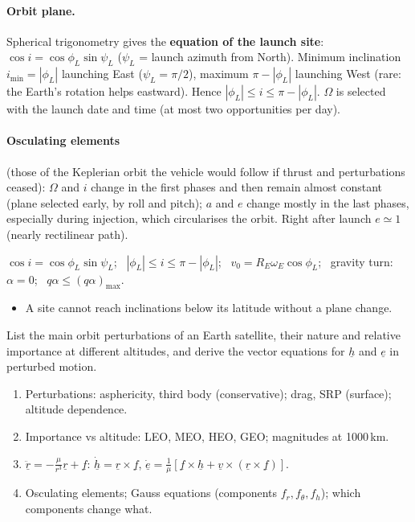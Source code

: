 \paragraph{Orbit plane.} Spherical trigonometry gives the \textbf{equation of the launch site}: $\cos i=\cos\phi_L\sin\psi_L$ ($\psi_L$ = launch azimuth from North).
Minimum inclination $i_{\min}=|\phi_L|$ launching East ($\psi_L=\pi/2$), maximum $\pi-|\phi_L|$ launching West (rare: the Earth's rotation helps eastward).
Hence $|\phi_L|\le i\le\pi-|\phi_L|$. $\Omega$ is selected with the launch date and time (at most two opportunities per day).
\paragraph{Osculating elements} (those of the Keplerian orbit the vehicle would follow if thrust and perturbations ceased): $\Omega$ and $i$ change in the
first phases and then remain almost constant (plane selected early, by roll and pitch); $a$ and $e$ change mostly in the last phases, especially
during injection, which circularises the orbit. Right after launch $e\simeq1$ (nearly rectilinear path).
\begin{keyf}
$\cos i=\cos\phi_L\sin\psi_L$; \ $|\phi_L|\le i\le\pi-|\phi_L|$; \ $v_0=R_E\omega_E\cos\phi_L$; \ gravity turn: $\alpha=0$; \ $q\alpha\le(q\alpha)_{\max}$.
\end{keyf}
\pitfalls
\begin{itemize}
\item A site cannot reach inclinations below its latitude without a plane change.
\end{itemize}

\begin{qbox}
List the main orbit perturbations of an Earth satellite, their nature and relative importance at different altitudes, and derive the vector equations
for $\underline h$ and $\underline e$ in perturbed motion.
\end{qbox}
\begin{outline}
\begin{enumerate}
\item Perturbations: asphericity, third body (conservative); drag, SRP (surface); altitude dependence.
\item Importance vs altitude: LEO, MEO, HEO, GEO; magnitudes at 1000\,km.
\item $\ddot{\underline r}=-\frac{\mu}{r^3}\underline r+\underline f$: $\dot{\underline h}=\underline r\times\underline f$, $\dot{\underline e}=\frac1\mu[\underline f\times\underline h+\underline v\times(\underline r\times\underline f)]$.
\item Osculating elements; Gauss equations (components $f_r,f_\theta,f_h$); which components change what.
\end{enumerate}
\end{outline}
\answer
